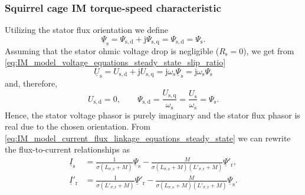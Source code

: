 \begin{frame}
	\frametitle{Squirrel cage IM torque-speed characteristic}
	Utilizing the stator flux orientation we define
	$$ \underline{\Psi}_\mathrm{s} = \Psi_\mathrm{s,d} + \mathrm{j}\Psi_\mathrm{s,q} = \Psi_\mathrm{s,d} = \Psi_\mathrm{s}.
	$$
	\pause
	Assuming that the stator ohmic voltage drop is negligible ($R_\mathrm{s}=0$), we get from \eqref{eq:IM_model_voltage_equations_steady_state_slip_ratio}
	\begin{equation}
		\underline{U}_\mathrm{s} = U_\mathrm{s,d} + \mathrm{j} U_\mathrm{s,q} = \mathrm{j}\omega_\mathrm{s}\underline{\Psi}_\mathrm{s} = \mathrm{j}\omega_\mathrm{s}\Psi_\mathrm{s}
	\end{equation}
	\pause
	and, therefore,
	\begin{equation}
		U_\mathrm{s,d} = 0, \qquad \Psi_\mathrm{s,d}  = \frac{U_\mathrm{s,q}}{\omega_\mathrm{s}}= \frac{U_\mathrm{s}}{\omega_\mathrm{s}}= \Psi_\mathrm{s}.
		\label{eq:IM_model_stator_flux_orientation_steady_state}
	\end{equation}
	Hence, the stator voltage phasor is purely imaginary and the stator flux phasor is real due to the chosen orientation. \pause From \eqref{eq:IM_model_current_flux_linkage_equations_steady_state} we can rewrite the flux-to-current relationships as
	\begin{equation}
		\begin{split}
			\underline{I}_\mathrm{s}  & = \frac{1}{\sigma (L_{\sigma,\mathrm{s}} +M)} \underline{\Psi}_\mathrm{s} -  \frac{M}{\sigma(L_{\sigma,\mathrm{s}} +M)(L'_{\sigma,\mathrm{r}} +M)}\underline{\Psi}'_\mathrm{r},  \\
			\underline{I}'_\mathrm{r} & = \frac{1}{\sigma (L'_{\sigma,\mathrm{r}} +M)} \underline{\Psi}'_\mathrm{r} -  \frac{M}{\sigma(L_{\sigma,\mathrm{s}} +M)(L'_{\sigma,\mathrm{r}} +M)}\underline{\Psi}_\mathrm{s}.
		\end{split}
		\label{eq:IM_model_current_flux_linkage_equations_steady_state_squirrel_cage}
	\end{equation}
\end{frame}


